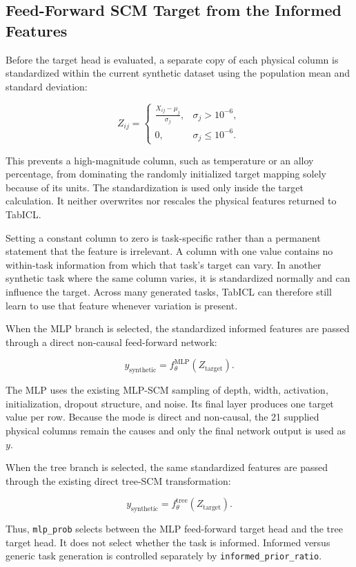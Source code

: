 \documentclass{article}
\begin{document}
\subsection{Feed-Forward SCM Target from the Informed Features}

Before the target head is evaluated, a separate copy of each physical column is
standardized within the current synthetic dataset using the population mean and
standard deviation:

\[
Z_{ij}
=
\begin{cases}
\displaystyle
\frac{X_{ij}-\mu_j}{\sigma_j},
& \sigma_j>10^{-6},\\[8pt]
0,
& \sigma_j\leq10^{-6}.
\end{cases}
\]

This prevents a high-magnitude column, such as temperature or an alloy
percentage, from dominating the randomly initialized target mapping solely
because of its units. The standardization is used only inside the target
calculation. It neither overwrites nor rescales the physical features returned
to TabICL.

Setting a constant column to zero is task-specific rather than a permanent
statement that the feature is irrelevant. A column with one value contains no
within-task information from which that task's target can vary. In another
synthetic task where the same column varies, it is standardized normally and
can influence the target. Across many generated tasks, TabICL can therefore
still learn to use that feature whenever variation is present.

When the MLP branch is selected, the standardized informed features are passed
through a direct non-causal feed-forward network:

\[
y_{\mathrm{synthetic}}
=
f_{\theta}^{\mathrm{MLP}}
\!\left(Z_{\mathrm{target}}\right).
\]

The MLP uses the existing MLP-SCM sampling of depth, width, activation,
initialization, dropout structure, and noise. Its final layer produces one
target value per row. Because the mode is direct and non-causal, the 21
supplied physical columns remain the causes and only the final network output
is used as \(y\).

When the tree branch is selected, the same standardized features are passed
through the existing direct tree-SCM transformation:

\[
y_{\mathrm{synthetic}}
=
f_{\theta}^{\mathrm{tree}}
\!\left(Z_{\mathrm{target}}\right).
\]

Thus, \texttt{mlp\_prob} selects between the MLP feed-forward target head and
the tree target head. It does not select whether the task is informed.
Informed versus generic task generation is controlled separately by
\texttt{informed\_prior\_ratio}.
\end{document}
